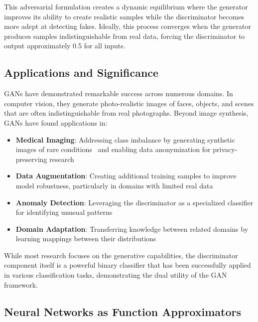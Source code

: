 This adversarial formulation creates a dynamic equilibrium where the generator improves its ability to create realistic samples while the discriminator becomes more adept at detecting fakes. Ideally, this process converges when the generator produces samples indistinguishable from real data, forcing the discriminator to output approximately 0.5 for all inputs.

\subsection{Applications and Significance}

GANs have demonstrated remarkable success across numerous domains. In computer vision, they generate photo-realistic images of faces, objects, and scenes that are often indistinguishable from real photographs. Beyond image synthesis, GANs have found applications in:

\begin{itemize}
  \item \textbf{Medical Imaging}: Addressing class imbalance by generating synthetic images of rare conditions~\cite{ref:nazki-2018,ref:valerio-2017,ref:frid-2018} and enabling data anonymization for privacy-preserving research~\cite{ref:shin-2018}
  
  \item \textbf{Data Augmentation}: Creating additional training samples to improve model robustness, particularly in domains with limited real data
  
  \item \textbf{Anomaly Detection}: Leveraging the discriminator as a specialized classifier for identifying unusual patterns~\cite{ref:cortes-2017,ref:odena-2016}
  
  \item \textbf{Domain Adaptation}: Transferring knowledge between related domains by learning mappings between their distributions
\end{itemize}

While most research focuses on the generative capabilities, the discriminator component itself is a powerful binary classifier that has been successfully applied in various classification tasks, demonstrating the dual utility of the GAN framework.

\subsection{Neural Networks as Function Approximators}

